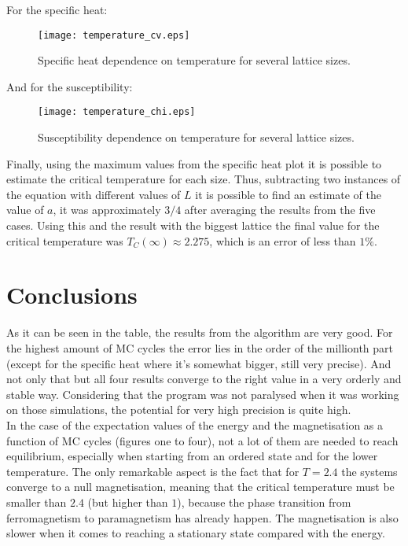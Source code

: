 \documentclass[11pt,a4paper,oneside]{article}
\begin{document}
		For the specific heat:\\
		
		\begin{figure}[ht!]\begin{center}\texttt{[image: temperature\_cv.eps]}\par\protect\caption{\scriptsize Specific heat dependence on temperature for several lattice sizes.}\end{center}\end{figure}
		
		And for the susceptibility:\\
		
		\begin{figure}[ht!]\begin{center}\texttt{[image: temperature\_chi.eps]}\par\protect\caption{\scriptsize Susceptibility dependence on temperature for several lattice sizes.}\end{center}\end{figure}
		
		Finally, using the maximum values from the specific heat plot it is possible to estimate the critical temperature for each size. Thus, subtracting two instances of the equation with different values of $L$ it is possible to find an estimate of the value of $a$, it was approximately $3/4$ after averaging the results from the five cases. Using this and the result with the biggest lattice the final value for the critical temperature was $T_C\left(\infty\right)\approx2.275$, which is an error of less than $1\%$.\\
		
	\section{Conclusions}
	
		As it can be seen in the table, the results from the algorithm are very good. For the highest amount of MC cycles the error lies in the order of the millionth part (except for the specific heat where it's somewhat bigger, still very precise). And not only that but all four results converge to the right value in a very orderly and stable way. Considering that the program was not paralysed when it was working on those simulations, the potential for very high precision is quite high.\\
		
		In the case of the expectation values of the energy and the magnetisation as a function of MC cycles (figures one to four), not a lot of them are needed to reach equilibrium, especially when starting from an ordered state and for the lower temperature. The only remarkable aspect is the fact that for $T=2.4$ the systems converge to a null magnetisation, meaning that the critical temperature must be smaller than $2.4$ (but higher than $1$), because the phase transition from ferromagnetism to paramagnetism has already happen. The magnetisation is also slower when it comes to reaching a stationary state compared with the energy.\\
		
\end{document}
